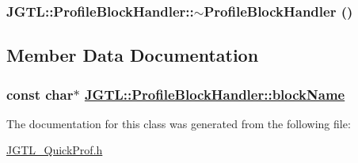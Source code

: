 \hypertarget{class_j_g_t_l_1_1_profile_block_handler_f34ae362cae1c68367c1221a088ef71f}{
\subsubsection[$\sim$ProfileBlockHandler]{\setlength{\rightskip}{0pt plus 5cm}JGTL::Profile\-Block\-Handler::$\sim$Profile\-Block\-Handler ()}}
\label{class_j_g_t_l_1_1_profile_block_handler_f34ae362cae1c68367c1221a088ef71f}




\subsection{Member Data Documentation}
\hypertarget{class_j_g_t_l_1_1_profile_block_handler_b6f85efe1308fbe8c802c26411fb28f2}{
\subsubsection[blockName]{\setlength{\rightskip}{0pt plus 5cm}const char$\ast$ \hyperlink{class_j_g_t_l_1_1_profile_block_handler_b6f85efe1308fbe8c802c26411fb28f2}{JGTL::Profile\-Block\-Handler::block\-Name}}}
\label{class_j_g_t_l_1_1_profile_block_handler_b6f85efe1308fbe8c802c26411fb28f2}




The documentation for this class was generated from the following file:\begin{CompactItemize}
\item 
\hyperlink{_j_g_t_l___quick_prof_8h}{JGTL\_\-Quick\-Prof.h}\end{CompactItemize}
